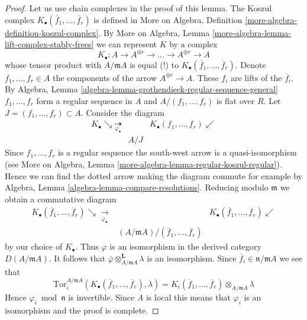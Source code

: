 \begin{proof}
Let us use chain complexes in the proof of this lemma.
The Koszul complex $K_\bullet(\overline{f}_1, \ldots, \overline{f}_r)$
is defined in More on Algebra, Definition
\ref{more-algebra-definition-koszul-complex}.
By More on Algebra, Lemma \ref{more-algebra-lemma-lift-complex-stably-frees}
we can represent $K$ by a complex
$$
K_\bullet :
A \to A^{\oplus r} \to \ldots \to A^{\oplus r} \to A
$$
whose tensor product with $A/\mathfrak mA$ is equal (!)
to $K_\bullet(\overline{f}_1, \ldots, \overline{f}_r)$.
Denote $f_1, \ldots, f_r \in A$ the components of the
arrow $A^{\oplus r} \to A$. These $f_i$ are lifts of the
$\overline{f}_i$. By Algebra, Lemma
\ref{algebra-lemma-grothendieck-regular-sequence-general}
$f_1, \ldots, f_r$ form a regular sequence in $A$ and $A/(f_1, \ldots, f_r)$
is flat over $R$. Let $J = (f_1, \ldots, f_r) \subset A$.
Consider the diagram
$$
\begin{array}{ccc}K_\bullet \searrow\underset{\varphi_\bullet}{\dashrightarrow} &  & K_\bullet(f_1, \ldots, f_r) \swarrow \\  & A/J & \end{array}
$$
Since $f_1, \ldots, f_r$ is a regular sequence the south-west arrow
is a quasi-isomorphism (see
More on Algebra, Lemma \ref{more-algebra-lemma-regular-koszul-regular}).
Hence we can find the dotted arrow making the
diagram commute for example by
Algebra, Lemma \ref{algebra-lemma-compare-resolutions}.
Reducing modulo $\mathfrak m$ we obtain a commutative diagram
$$
\begin{array}{ccc}K_\bullet(\overline{f}_1, \ldots, \overline{f}_r)
\searrow\underset{\overline{\varphi}_\bullet}{\longrightarrow} &  & K_\bullet(\overline{f}_1, \ldots, \overline{f}_r) \swarrow \\  & (A/\mathfrak m A)/(\overline{f}_1, \ldots, \overline{f}_r) & \end{array}
$$
by our choice of $K_\bullet$. Thus $\overline{\varphi}$ is an isomorphism
in the derived category $D(A/\mathfrak m A)$. It follows that
$\overline{\varphi} \otimes_{A/\mathfrak m A}^\mathbf{L} \lambda$
is an isomorphism. Since $\overline{f}_i \in \mathfrak n / \mathfrak m A$
we see that
$$
\text{Tor}_i^{A/\mathfrak m A}(
K_\bullet(\overline{f}_1, \ldots, \overline{f}_r), \lambda)
=
K_i(\overline{f}_1, \ldots, \overline{f}_r) \otimes_{A/\mathfrak m A} \lambda
$$
Hence $\varphi_i \bmod \mathfrak n$ is invertible.
Since $A$ is local this means that $\varphi_i$ is an
isomorphism and the proof is complete.
\end{proof}

